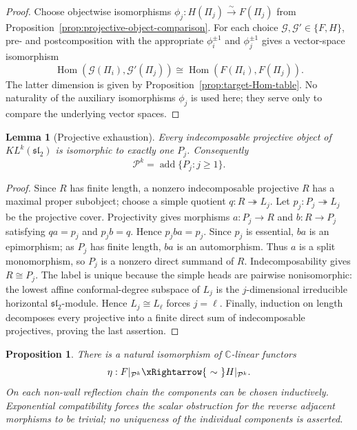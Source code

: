 \documentclass[12pt,leqno]{amsart}
\numberwithin{equation}{section}
\newtheorem{lem}[thm]{Lemma}
\newtheorem{prop}[thm]{Proposition}
\newcommand{\Hom}{\operatorname{Hom}}
\newcommand{\KL}{KL}
\def\C{\mathbb{C}}
\begin{document}
\begin{proof}
Choose objectwise isomorphisms
$\phi_j:H(\Pi_j)\xrightarrow{\sim}F(\Pi_j)$ from
Proposition~\ref{prop:projective-object-comparison}.  For each choice $\mathscr G,\mathscr G'\in\{F,H\}$,
pre- and postcomposition with the appropriate $\phi_i^{\pm1}$ and
$\phi_j^{\pm1}$ gives a vector-space isomorphism
\[
 \Hom(\mathscr G(\Pi_i),\mathscr G'(\Pi_j))
 \cong \Hom(F(\Pi_i),F(\Pi_j)).
\]
The latter dimension is given by Proposition~\ref{prop:target-Hom-table}.
No naturality of the auxiliary isomorphisms $\phi_j$ is used here; they
serve only to compare the underlying vector spaces.
\end{proof}

\begin{lem}[Projective exhaustion]\label{lem:projective-exhaustion}
Every indecomposable projective object of $\KL^k(\mathfrak{sl}_2)$ is
isomorphic to exactly one $P_j$.  Consequently
\[
 \mathcal P^k=\operatorname{add}\{P_j:j\ge1\}.
\]
\end{lem}

\begin{proof}
Since $R$ has finite length, a nonzero indecomposable projective $R$
has a maximal proper subobject; choose a simple quotient
$q:R\twoheadrightarrow L_j$.  Let
$p_j:P_j\twoheadrightarrow L_j$ be the projective cover.  Projectivity
gives morphisms $a:P_j\to R$ and $b:R\to P_j$ satisfying
$q a=p_j$ and $p_j b=q$.  Hence $p_jba=p_j$.  Since $p_j$ is essential,
$ba$ is an epimorphism; as $P_j$ has finite length, $ba$ is an
automorphism.  Thus $a$ is a split monomorphism, so $P_j$ is a nonzero
direct summand of $R$.  Indecomposability gives $R\cong P_j$.  The label
is unique because the simple heads are pairwise nonisomorphic: the lowest
affine conformal-degree subspace of $L_j$ is the $j$-dimensional
irreducible horizontal $\mathfrak{sl}_2$-module.  Hence
$L_j\cong L_\ell$ forces $j=\ell$.  Finally, induction on length decomposes
every projective into a finite direct sum of indecomposable projectives,
proving the last assertion.
\end{proof}

\begin{prop}\label{prop:natural-on-projectives}
There is a natural isomorphism of $\C$-linear functors
\[
 \eta:F|_{\mathcal P^k}\xRightarrow{\ \sim\ }H|_{\mathcal P^k}.
\]
On each non-wall reflection chain the components can be chosen
inductively.  Exponential compatibility forces the scalar obstruction for
the reverse adjacent morphisms to be trivial; no uniqueness of the
individual components is asserted.
\end{prop}
\end{document}
